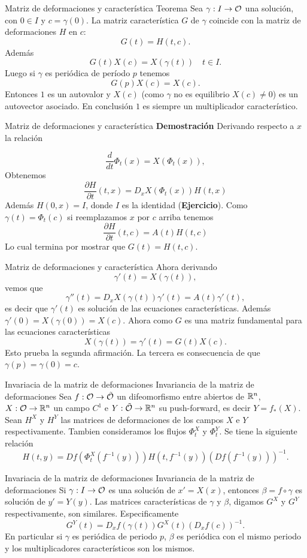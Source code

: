  

{Matriz de deformaciones y característica}
{Teorema} Sea $\gamma:I\to\mathcal{O}$ una solución, con $0\in I$ y $c=\gamma(0)$. La matriz característica 
$G$ de $\gamma$ coincide con la matriz de deformaciones $H$ en $c$:
\[G(t)=H(t,c).\]
Además
\[G(t)X(c)=X(\gamma(t))\quad t\in I.\]
Luego si $\gamma$ es periódica de período $p$ tenemos
\[G(p)X(c)=X(c).\]
Entonces $1$ es un autovalor y $X(c)$ (como $\gamma$ no es equilibrio $X(c)\neq 0$) es un autovector asociado.
En conclusión $1$ es siempre un multiplicador característico.


 

{Matriz de deformaciones y característica}
\textbf{Demostración} Derivando respecto a $x$ la relación

\[\frac{d}{dt}\Phi_t(x)=X(\Phi_t(x)),\]
Obtenemos
\[\frac{\partial H}{\partial t}(t,x)=D_xX(\Phi_t(x))H(t,x)\]
Además $H(0,x)=I$, donde $I$ es la identidad (\textbf{Ejercicio}). Como $\gamma(t)=\Phi_t(c)$ si reemplazamos $x$
por $c$ arriba tenemos 
\[
 \frac{\partial H}{\partial t}(t,c)=A(t)H(t,c)
\]
Lo cual termina por mostrar que $G(t)=H(t,c)$. 




{Matriz de deformaciones y característica}
 Ahora derivando
 \[\gamma'(t)=X(\gamma(t)),\]
 vemos que
  \[\gamma''(t)=D_xX(\gamma(t))\gamma'(t)=A(t)\gamma'(t),\]
  es decir que $\gamma'(t)$ es solución de las ecuaciones características. Además $\gamma'(0)=X(\gamma(0))=X(c)$. 
  Ahora como $G$ es una matriz fundamental para las ecuaciones características
  \[X(\gamma(t))=\gamma'(t)=G(t)X(c).\]
  Esto prueba la segunda afirmación. La tercera es consecuencia de que $\gamma(p)=\gamma(0)=c$.
 
 
 
 
 {Invariacia de la matriz de deformaciones}
{Invariancia de la matriz de deformaciones}
Sea $f:\mathcal{O}\to\tilde{\mathcal{O}}$ un difeomorfismo entre abiertos de $\mathbb{R}^n$, $X:\mathcal{O}\to\mathbb{R}^n$ un campo $C^1$ e $Y:\tilde{\mathcal{O}}\to\mathbb{R}^n$ su push-forward, es decir $Y=f_*(X)$.
Sean $H^X$ y $H^Y$ las matrices de deformaciones de los campos $X$ e $Y$ respectivamente. Tambien consideramos los flujos $\Phi_t^X$ y $\Phi_t^Y$. Se tiene la siguiente 
relación
\begin{equation}\label{def_mat}H(t,y)=Df(\Phi^X_t(f^{-1}(y)))H(t,f^{-1}(y)) \left(Df(f^{-1}(y))\right)^{-1}.\end{equation}



 
 
  {Invariacia de la matriz de deformaciones}
{Invariancia de la matriz de deformaciones}
Si $\gamma:I\to\mathcal{O}$ es una solución de $x'=X(x)$, entonces $\beta=f\circ\gamma$ es solución de $y'=Y(y)$. Las matrices características 
de $\gamma$ y $\beta$, digamos  $G^X$ y $G^Y$ respectivamente, son similares. Especificamente
\begin{equation}\label{car_mat}G^Y(t)=D_xf(\gamma(t))G^X(t)\left(D_xf(c)\right)^{-1}.\end{equation}
En particular si $\gamma$ es periódica de periodo $p$, $\beta$ es periódica con el mismo periodo y los multiplicadores característicos son los mismos.




